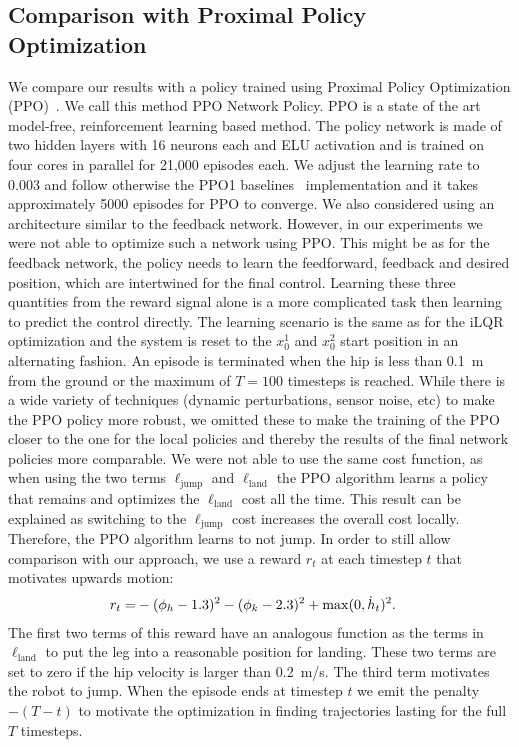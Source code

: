 \subsection{Comparison with Proximal Policy Optimization}
We compare our results with a policy trained using Proximal Policy Optimization (PPO)~\cite{schulman2017proximal}. We call this method PPO Network Policy. PPO is a state of the art model-free, reinforcement learning based method. The policy network is made of two hidden layers with 16 neurons each and ELU activation and is trained on four cores in parallel for 21,000 episodes each. We adjust the learning rate to 0.003 and follow otherwise the PPO1 baselines~\cite{baselines} implementation and it takes approximately 5000 episodes for PPO to converge. We also considered using an architecture similar to the feedback network. However, in our experiments we were not able to optimize such a network using PPO. This might be as for the feedback network, the policy needs to learn the feedforward, feedback and desired position, which are intertwined for the final control. Learning these three quantities from the reward signal alone is a more complicated task then learning to predict the control directly.
%
The learning scenario is the same as for the iLQR optimization and the system is reset to the $x^1_0$ and $x^2_0$ start position in an alternating fashion. An episode is terminated when the hip is less than \SI{0.1}{\meter} from the ground or the maximum of $T=100$ timesteps is reached. While there is a wide variety of techniques (dynamic perturbations,
sensor noise, etc) to make the PPO policy more robust, we omitted these to make the training of the PPO closer to the one for the local policies and thereby the results of the final network policies more comparable. We were not able to use the same cost function, as when using the two terms
$\ell_\textrm{jump}$ and $\ell_\textrm{land}$ the PPO algorithm learns a policy that remains and optimizes the $\ell_\textrm{land}$ cost all the time.
This result can be explained as switching to the $\ell_\textrm{jump}$ cost increases the overall cost locally. Therefore, the PPO algorithm learns to not jump. In order to still allow comparison with our approach,
we use a reward $r_t$ at each timestep $t$ that motivates upwards motion:
%
\begin{align}
  r_t =& -({\phi_h} - 1.3)^2 - ({\phi_k} - 2.3)^2 + \max(0, \dot{h}_t)^2. \nonumber
\end{align}
%
The first two terms of this reward have an analogous function as the terms in $\ell_\textrm{land}$ to put the leg into a reasonable position for landing. These two terms are set to zero if the hip velocity is larger than \SI{0.2}{\meter/\second}. The third term motivates the robot to jump. When the episode ends at timestep $t$ we emit the penalty $ -(T - t)$ to motivate the optimization in finding trajectories lasting for the full $T$ timesteps.

